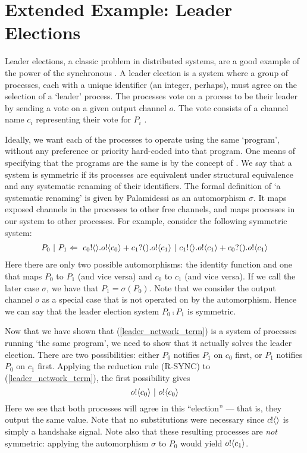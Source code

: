 \section{Extended Example: Leader Elections}\label{secleaderelecs}
Leader elections, a classic problem in distributed systems, are a good example of the power of the synchronous \picalc.
A leader election is a system where a group of processes, each with a unique identifier (an integer, perhaps), must agree on the selection of a `leader' process.
The processes vote on a process to be their leader by sending a vote on a given output channel $o$.   
The vote consists of a channel name $c_i$ representing their vote for $P_i$ .  

Ideally, we want each of the processes to operate using the same `program', without any preference or priority hard-coded into that program.
One means of specifying that the programs are the same is by the concept of .
We say that a system is symmetric if its processes are equivalent under structural equivalence and any systematic renaming of their identifiers.
The formal definition of `a systematic renaming' is given by Palamidessi \cite{palam03} as an automorphism $\sigma$.
It maps exposed channels in the processes to other free channels, and maps processes in our system to other processes.
For example, consider the following symmetric system:
\begin{align}
	P_0\ |\  P_1 \Leftarrow\  {c_0}!\langle{}\rangle. {o}!\langle{c_0}\rangle + {c_1}?({}). {o}!\langle{c_1}\rangle \ |\  {c_1}!\langle{}\rangle. {o}!\langle{c_1}\rangle + {c_0}?({}). {o}!\langle{c_1}\rangle
	\label{leader_network_term}	
\end{align}
Here there are only two possible automorphisms: the identity function and one that maps $P_0$ to $P_1$ (and vice versa) and $c_0$ to $c_1$ (and vice versa).  
If we call the later case $\sigma$, we have that $P_1 = \sigma(P_0)$. 
Note that we consider the output channel $o$ as a special case that is not operated on by the automorphism.
Hence we can say that the leader election system $P_0 \comp P_1$ is symmetric.

Now that we have shown that (\ref{leader_network_term}) is a system of processes running `the same program', we need to show that it actually solves the leader election. 
There are two possibilities: either $P_0$ notifies $P_1$ on $c_0$ first, or $P_1$ notifies $P_0$ on $c_1$ first.  
Applying the reduction rule (R-SYNC) to (\ref{leader_network_term}), the first possibility gives
\[
	 {o}!\langle{c_0}\rangle \ |\  {o}!\langle{c_0}\rangle	
\]
Here we see that both processes will agree in this ``election'' --- that is, they output the same value.  Note that no substitutions were necessary since ${c}!\langle{}\rangle$ is simply a handshake signal.  Note also that these resulting processes are \emph{not} symmetric: applying the automorphism $\sigma$ to $P_0$ would yield ${o}!\langle{c_1}\rangle$.

